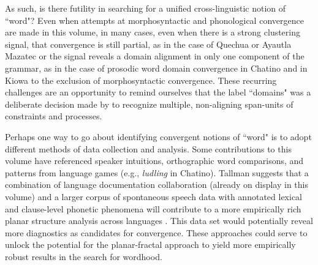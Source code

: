 \documentclass[output=paper]{langscibook}
\begin{document}
As such, is there futility in searching for a unified cross-linguistic notion of ``word"? Even when attempts at morphosyntactic and phonological convergence are made in this volume, in many cases, even when there is a strong clustering signal, that convergence is still partial, as in the case of Quechua  or Ayautla Mazatec  or the signal reveals a domain alignment in only one component of the grammar, as in the case of prosodic word domain convergence in Chatino  and in Kiowa  to the exclusion of morphosyntactic convergence. These recurring challenges are an opportunity to remind ourselves that the label ``domains" was a deliberate decision made by \citet{schieringetal:2010} to recognize multiple, non-aligning span-units of constraints and processes.

Perhaps one way to go about identifying convergent notions of ``word" is to adopt different methods of data collection and analysis. Some contributions to this volume have referenced speaker intuitions, orthographic word comparisons, and patterns from language games (e.g., \textit{ludling} in Chatino). Tallman  suggests that a combination of language documentation collaboration (already on display in this volume) and a larger corpus of spontaneous speech data with annotated lexical and clause-level phonetic phenomena will contribute to a more empirically rich planar structure analysis across languages \citep{tallman2023phonology/phonetics}. This data set would potentially reveal more diagnostics as candidates for convergence. These approaches could serve to unlock the potential for the planar-fractal approach to yield more empirically robust results in the search for wordhood.


\sloppy\printbibliography[heading=subbibliography,notkeyword=this]
\end{document}
